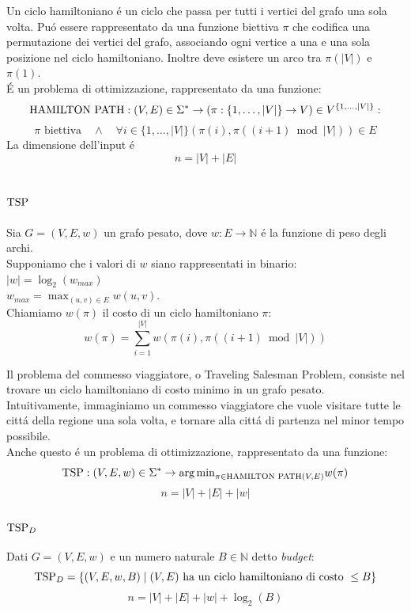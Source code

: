 Un ciclo hamiltoniano é un ciclo che passa per tutti i vertici del grafo una sola volta.
Puó essere rappresentato da una funzione biettiva $\pi$ che codifica una permutazione dei vertici del grafo, 
associando ogni vertice a una e una sola posizione nel ciclo hamiltoniano.
Inoltre deve esistere un arco tra $\pi(|V|)$ e $\pi(1)$.\\
É un problema di ottimizzazione, rappresentato da una funzione:
\[
\text{HAMILTON PATH}: (V, E) \in \Sigma^* \rightarrow (\pi : \{1,\dots,|V|\} \rightarrow V) \in V^{\{1,\dots,|V|\}} :
\]
\[
\pi \text{ biettiva} \quad \land \quad \forall i \in \{1,\dots,|V|\} (\pi(i), \pi((i+1) \bmod {|V|})) \in E
\]
La dimensione dell'input é \\
\[
n = |V| + |E|
\]


\subsection{$\text{TSP}$}
\label{problema:tsp}
Sia $G = (V, E, w)$ un grafo pesato, dove $w: E \rightarrow \mathbb{N}$ é la funzione di peso degli archi. \\
Supponiamo che i valori di $w$ siano rappresentati in binario: \\
$|w| = \log_2(w_{max})$ \\
$w_{max} = \max_{(u, v) \in E} w(u, v)$. \\

Chiamiamo $w(\pi)$ il costo di un ciclo hamiltoniano $\pi$:
\[
w(\pi) = \sum_{i = 1}^{|V|} w(\pi(i), \pi((i+1) \bmod {|V|}))
\]

Il problema del commesso viaggiatore, o Traveling Salesman Problem, consiste nel trovare
un ciclo hamiltoniano di costo minimo in un grafo pesato. \\
Intuitivamente, immaginiamo un commesso viaggiatore che vuole visitare tutte le cittá della regione una sola volta, e tornare alla cittá di partenza nel minor tempo possibile. \\
Anche questo é un problema di ottimizzazione, rappresentato da una funzione:
\[
\text{TSP}: (V, E, w) \in \Sigma^* \rightarrow {\arg\min}_{\pi \in \text{HAMILTON PATH}(V, E)} w(\pi)
\]
\[
n = |V| + |E| + |w|
\]


\subsubsection{$\text{TSP}_D$}
Dati $G = (V, E, w)$ e un numero naturale $B \in \mathbb{N}$ detto \textit{budget}:
\[
\text{TSP}_D = \{ (V, E, w, B) \mid (V, E) \text{ ha un ciclo hamiltoniano di costo } \leq B \}
\]
\[
n = |V| + |E| + |w| + \log_2(B)
\]


